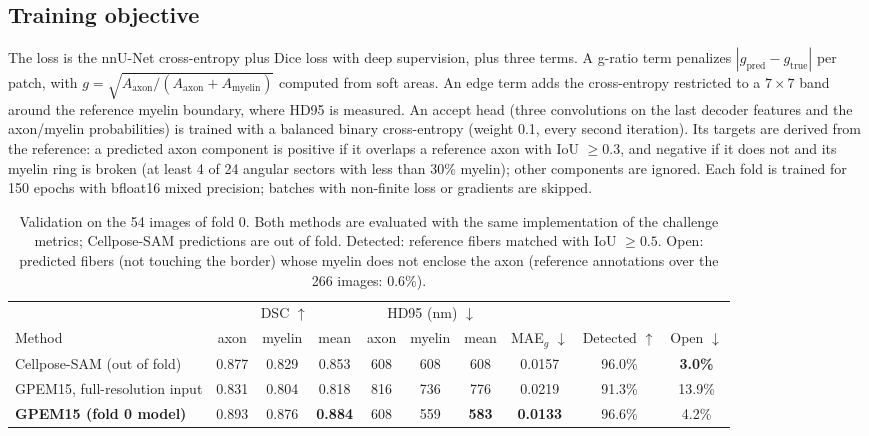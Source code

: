 \documentclass[journal]{IEEEtran}
\begin{document}
\subsection{Training objective}
The loss is the nnU-Net cross-entropy plus Dice loss with deep supervision,
plus three terms. A g-ratio term penalizes
$|g_{\text{pred}}-g_{\text{true}}|$ per patch, with
$g=\sqrt{A_{\text{axon}}/(A_{\text{axon}}+A_{\text{myelin}})}$ computed from
soft areas. An edge term adds the cross-entropy restricted to a $7\times7$
band around the reference myelin boundary, where HD95 is measured. An accept
head (three convolutions on the last decoder features and the axon/myelin
probabilities) is trained with a balanced binary cross-entropy (weight 0.1,
every second iteration). Its targets are derived from the reference: a
predicted axon component is positive if it overlaps a reference axon with IoU
$\geq0.3$, and negative if it does not and its myelin ring is broken (at least
4 of 24 angular sectors with less than 30\% myelin); other components are
ignored. Each fold is trained for 150 epochs with bfloat16 mixed precision;
batches with non-finite loss or gradients are skipped.

\begin{table}[t]
\caption{Validation on the 54 images of fold 0. Both methods are evaluated with
the same implementation of the challenge metrics; Cellpose-SAM predictions are
out of fold. Detected: reference fibers matched with IoU $\geq0.5$. Open:
predicted fibers (not touching the border) whose myelin does not enclose the
axon (reference annotations over the 266 images: 0.6\%).}
\label{tab:results}
\centering
\footnotesize
\setlength{\tabcolsep}{4pt}
\begin{tabular}{@{}lccccccccc@{}}
\toprule
 & \multicolumn{3}{c}{DSC $\uparrow$} & \multicolumn{3}{c}{HD95 (nm) $\downarrow$} & & & \\
\cmidrule(lr){2-4}\cmidrule(lr){5-7}
Method & axon & myelin & mean & axon & myelin & mean & MAE$_g$ $\downarrow$ & Detected $\uparrow$ & Open $\downarrow$ \\
\midrule
Cellpose-SAM (out of fold)            & 0.877 & 0.829 & 0.853 & 608 & 608 & 608 & 0.0157 & 96.0\% & \textbf{3.0\%} \\
GPEM15, full-resolution input         & 0.831 & 0.804 & 0.818 & 816 & 736 & 776 & 0.0219 & 91.3\% & 13.9\% \\
\textbf{GPEM15 (fold 0 model)}  & 0.893 & 0.876 & \textbf{0.884} & 608 & 559 & \textbf{583} & \textbf{0.0133} & 96.6\% & 4.2\% \\
\bottomrule
\end{tabular}
\end{table}
\end{document}
